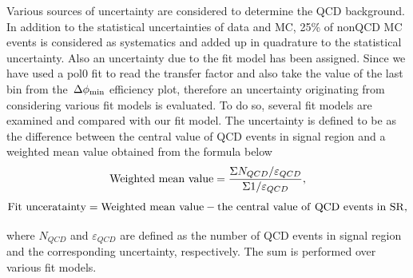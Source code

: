 Various sources of uncertainty are considered to determine the QCD background. 
In addition to the statistical uncertainties of data and MC, 25\% of 
nonQCD MC events is considered as systematics and added up in quadrature to the statistical uncertainty.
Also an uncertainty due to the fit model has been assigned. Since we have used a pol0 fit 
to read the transfer factor and also take the value of the last bin from the $\,{\Delta\phi_{\rm min}}$ efficiency plot,
therefore an uncertainty originating from considering various fit models is evaluated. To do so, several 
fit models are examined and compared with our fit model. The uncertainty is defined to be as the 
difference between the central value of QCD events in signal region and a weighted mean value obtained from the formula below 
\begin{equation}
{\rm Weighted~mean~value} =\frac{\Sigma N_{QCD}/\varepsilon_{QCD}}{\Sigma 1/\varepsilon_{QCD}},
\end{equation}
\begin{equation}
{\rm Fit~unceratainty} ={\rm Weighted~mean~value}-{\rm the~central~value~of~QCD~events~in~SR},
\end{equation}

where $N_{QCD}$ and $\varepsilon_{QCD}$ are defined as the number of QCD events in signal region and 
the corresponding uncertainty, respectively. The sum is performed over various fit models.\\ 

